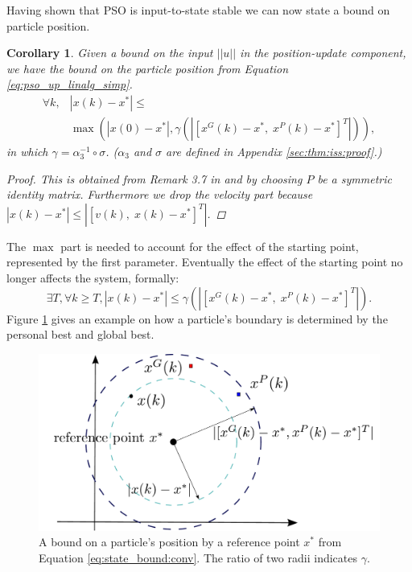 \documentclass{sig-alternate}
\newtheorem{mycoro}{Corollary}
\begin{document}
Having shown that PSO is input-to-state stable we can now state a bound on particle position.

\begin{mycoro}
\label{coro:state_bound}
Given a bound on the input $ || u || $ in the position-update component, we have the bound on the particle position from Equation \eqref{eq:pso_up_linalg_simp}.
\begin{equation}
\label{eq:state_bound}
\begin{aligned}
\forall k, 
& | x(k) - x^{*} | \leq \\
& \max \left( | x(0) - x^{*} | , \gamma ( | \left[ x^{G}(k) - x^{*}, \; x^{P}(k) - x^{*} \right]^{T} | ) \right),
\end{aligned}
\end{equation}
in which $ \gamma = \alpha_{3}^{-1} \circ \sigma $.
($ \alpha_{3} $ and $ \sigma $ are defined in Appendix \ref{sec:thm:iss:proof}.)
\begin{proof}
This is obtained from Remark 3.7 in \cite{Jiang2001857} and by choosing $ P $ be a symmetric identity matrix.
Furthermore we drop the velocity part because $ | x(k) - x^{*} | \leq | [ v(k), \; x(k) - x^{*} ]^{T} | $.
\end{proof}
\end{mycoro}

The $ \max $ part is needed to account for the effect of the starting point, represented by the first parameter. Eventually the effect of the starting point no longer affects the system, formally:
\begin{equation}
\label{eq:state_bound:conv}
\exists T, \forall k \geq T, 
|  x(k) - x^{*} | \leq \gamma ( | [ x^{G}(k) - x^{*}, \; x^{P}(k) - x^{*} ]^{T} | ).
\end{equation}
Figure \ref{fig:boundary} gives an example on how a particle's boundary is determined by the personal best and global best.

\begin{figure}
\centering
\includegraphics[width=0.8\linewidth]{./boundary}
\caption{A bound on a particle's position by a reference point $ x^{*} $ from Equation \eqref{eq:state_bound:conv}.
The ratio of two radii indicates $ \gamma $.}
\label{fig:boundary}
\end{figure}
\end{document}

